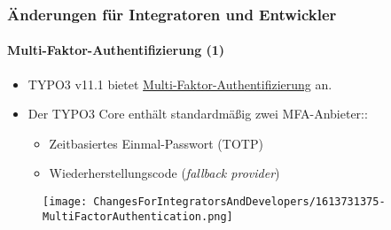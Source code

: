%

\begin{frame}[fragile]
	\frametitle{Änderungen für Integratoren und Entwickler}
	\framesubtitle{Multi-Faktor-Authentifizierung (1)}


	\begin{itemize}
		\item TYPO3 v11.1 bietet
			\href{https://en.wikipedia.org/wiki/Multi-factor_authentication}{Multi-Faktor-Authentifizierung} an.
		\item Der TYPO3 Core enthält standardmäßig zwei MFA-Anbieter::

			\begin{itemize}
				\item Zeitbasiertes Einmal-Passwort (TOTP)
				\item Wiederherstellungscode (\textit{fallback provider})
			\end{itemize}

	\end{itemize}

	\begin{figure}
		\texttt{[image: ChangesForIntegratorsAndDevelopers/1613731375-MultiFactorAuthentication.png]}
	\end{figure}

\end{frame}


